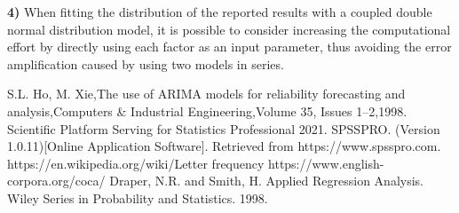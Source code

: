 \documentclass[12pt]{mcmthesis}
\begin{document}
\textbf{4)} When fitting the distribution of the reported results with a coupled double normal distribution model, it is possible to consider increasing the computational effort by directly using each factor as an input parameter, thus avoiding the error amplification caused by using two models in series.
 
\newpage
\begin{thebibliography}{99}
	S.L. Ho, M. Xie,The use of ARIMA models for reliability forecasting and analysis,Computers \& Industrial Engineering,Volume 35, Issues 1–2,1998.
	Scientific Platform Serving for Statistics Professional 2021. SPSSPRO. (Version 1.0.11)[Online Application Software]. Retrieved from https://www.spsspro.com.
	https://en.wikipedia.org/wiki/Letter frequency
	https://www.english-corpora.org/coca/
	Draper, N.R. and Smith, H. Applied Regression Analysis. Wiley Series in Probability and Statistics. 1998.
\end{thebibliography}
\end{document}
